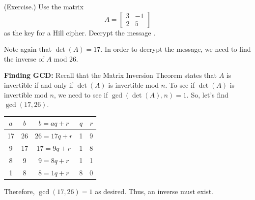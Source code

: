 \documentclass[letterpaper]{article}
\newcommand{\0}{\mathbf{0}}
\begin{document}
\begin{mdframed}
    (Exercise.) Use the matrix \[A = \begin{bmatrix}
        3 & -1 \\ 2 & 5
    \end{bmatrix}\] as the key for a Hill cipher. Decrypt the message .

    \begin{mdframed}
        Note again that $\det(A) = 17$. In order to decrypt the message, we need to find the inverse of $A$ mod 26.

        \bigskip 

        \textbf{Finding GCD:} Recall that the Matrix Inversion Theorem states that $A$ is invertible if and only if $\det(A)$ is invertible mod $n$. To see if $\det(A)$ is invertible mod $n$, we need to see if $\gcd(\det(A), n) = 1$. So, let's find $\gcd(17, 26)$.  
        \begin{center}
            \begin{tabular}{c|c|c|c|c}
                $a$ & $b$ & $b = aq + r$ & $q$ & $r$ \\ 
                \hline 
                17 & 26 & $26 = 17q + r$ & 1 & 9 \\ 
                9 & 17 & $17 = 9q + r$ & 1 & 8 \\ 
                8 & 9 & $9 = 8q + r$ & 1 & 1 \\ 
                1 & 8 & $8 = 1q + r$ & 8 & 0
            \end{tabular}
        \end{center}
        Therefore, $\gcd(17, 26) = 1$ as desired. Thus, an inverse must exist. 

        \bigskip 
        

\end{mdframed}
\end{mdframed}
\end{document}
